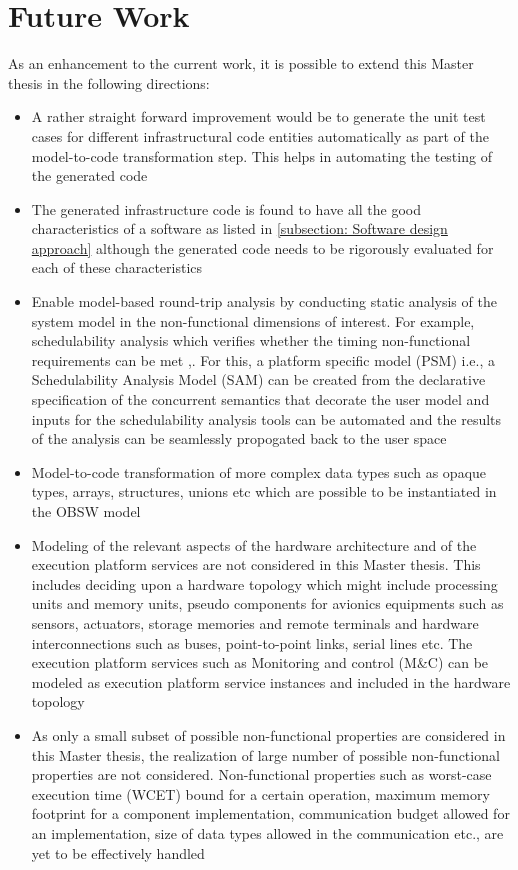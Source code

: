 \section{Future Work}
As an enhancement to the current work, it is possible to extend this Master thesis in the following directions:
\begin{itemize}
\item A rather straight forward improvement would be to generate the unit test cases for different infrastructural code entities automatically as part of the model-to-code transformation step. This helps in automating the testing of the generated code 
\item The generated infrastructure code is found to have all the good characteristics of a software as listed in \cref{subsection: Software design approach} although the generated code needs to be rigorously evaluated for each of these characteristics 
\item Enable model-based round-trip analysis by conducting static analysis of the system model in the non-functional dimensions of interest. For example, schedulability analysis which verifies whether the timing non-functional requirements can be met \cite{ScheduAnaly},\cite{CompBasedProcess}.  For this, a platform specific model (PSM) i.e., a Schedulability Analysis Model (SAM) can be created from the declarative specification of the concurrent semantics that decorate the user model and inputs for the schedulability analysis tools can be automated and the results of the analysis can be seamlessly propogated back to the user space \cite{ScheduAnaly}
\item Model-to-code transformation of more complex data types such as opaque types, arrays, structures, unions etc which are possible to be instantiated in the OBSW model
\item Modeling of the relevant aspects of the hardware architecture and of the execution platform services are not considered in this Master thesis. This includes deciding upon a hardware topology which might include processing units and memory units, pseudo components for avionics equipments such as sensors, actuators, storage memories and remote terminals and hardware interconnections such as buses, point-to-point links, serial lines etc. The execution platform services such as Monitoring and control (M\&C) can be modeled as execution platform service instances and included in the hardware topology  
\item As only a small subset of possible non-functional properties are considered in this Master thesis, the realization of large number of possible non-functional properties are not considered. Non-functional properties such as worst-case execution time (WCET) bound for a certain operation, maximum memory footprint for a component implementation, communication budget allowed for an implementation, size of data types allowed in the communication etc., are yet to be effectively handled

\end{itemize}

